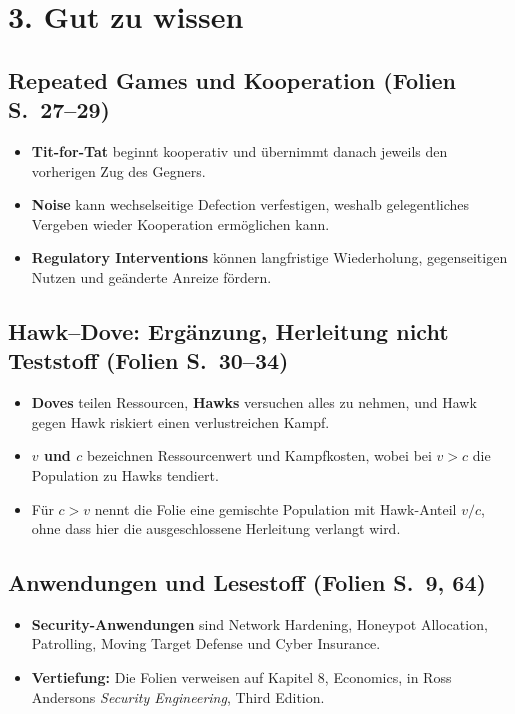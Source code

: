 \documentclass[11pt,a4paper]{article}
\newcommand{\block}[2]{\subsection*{#1 {\normalfont\small (Folien S.~#2)}}}
\begin{document}
\section*{3. Gut zu wissen}
\block{Repeated Games und Kooperation}{27--29}
\begin{itemize}
\item \textbf{Tit-for-Tat} beginnt kooperativ und übernimmt danach jeweils den vorherigen Zug des Gegners.
\item \textbf{Noise} kann wechselseitige Defection verfestigen, weshalb gelegentliches Vergeben wieder Kooperation ermöglichen kann.
\item \textbf{Regulatory Interventions} können langfristige Wiederholung, gegenseitigen Nutzen und geänderte Anreize fördern.
\end{itemize}
\block{Hawk--Dove: Ergänzung, Herleitung nicht Teststoff}{30--34}
\begin{itemize}
\item \textbf{Doves} teilen Ressourcen, \textbf{Hawks} versuchen alles zu nehmen, und Hawk gegen Hawk riskiert einen verlustreichen Kampf.
\item \textbf{$v$ und $c$} bezeichnen Ressourcenwert und Kampfkosten, wobei bei $v>c$ die Population zu Hawks tendiert.
\item Für \textbf{$c>v$} nennt die Folie eine gemischte Population mit Hawk-Anteil $v/c$, ohne dass hier die ausgeschlossene Herleitung verlangt wird.
\end{itemize}
\block{Anwendungen und Lesestoff}{9, 64}
\begin{itemize}
\item \textbf{Security-Anwendungen} sind Network Hardening, Honeypot Allocation, Patrolling, Moving Target Defense und Cyber Insurance.
\item \textbf{Vertiefung:} Die Folien verweisen auf Kapitel 8, Economics, in Ross Andersons \emph{Security Engineering}, Third Edition.
\end{itemize}

\newpage
\end{document}
